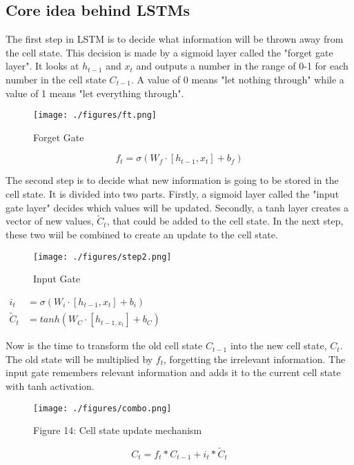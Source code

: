 \subsection{Core idea behind LSTMs}
The first step in LSTM is to decide what information will be thrown away from the cell state. This decision is made by a sigmoid layer called the "forget gate layer". It looks at $h_{t-1}$ and $x_t$ and outputs a number in the range of 0-1 for each number in the cell state $C_{t-1}$. A value of 0 means "let nothing through" while a value of 1 means "let everything through".
\begin{figure}[h]
	\centering
	\texttt{[image: ./figures/ft.png]}
	\caption{Forget Gate}
\end{figure}
$$
	f_t = \sigma(W_f\cdot [h_{t-1}, x_t] +b_f)
$$

The second step is to decide what new information is going to be stored in the cell state. It is divided into two parts. Firstly, a sigmoid layer called the "input gate layer" decides which values will be updated. Secondly, a tanh layer creates a vector of new values, $\tilde C_t$, that could be added to the cell state. In the next step, these two wiil be combined to create an update to the cell state.
\begin{figure}[h]
	\centering
	\texttt{[image: ./figures/step2.png]}	
	\caption{Input Gate}
\end{figure}

\begin{center}
$	\begin{array}{ll}
	i_t &= \sigma (W_i \cdot [h_{t-1}, x_t]+b_i)			\\
	\tilde C_t &= tanh(W_C \cdot [h_{t-1, x_t}]+b_C)
	\end{array}
$
\end{center}

Now is the time to transform the old cell state $C_{t-1}$ into the new cell state, $C_t$. The old state will be multiplied by $f_t$, forgetting the irrelevant information. The input gate remembers relevant information and adds it to the current cell state with tanh activation.

\begin{figure}[h]
	\texttt{[image: ./figures/combo.png]}
	\caption{Figure 14: Cell state update mechanism}
\end{figure}

$$
	C_t = f_t * C_{t-1} + i_t * \tilde C_t
$$

